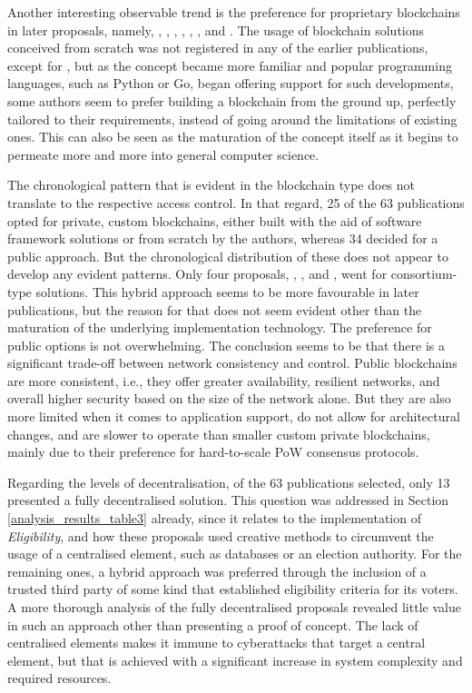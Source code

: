 \documentclass[../access.tex]{subfiles}
\begin{document}
\par
Another interesting observable trend is the preference for proprietary blockchains in later proposals, namely, \cite{Matile2019}, \cite{Faour2019}, \cite{Murtaza2019}, \cite{Yi2019}, \cite{Killer2020}, \cite{Han2020}, and \cite{Mani2022}. The usage of blockchain solutions conceived from scratch was not registered in any of the earlier publications, except for \cite{BenAyed2017}, but as the concept became more familiar and popular programming languages, such as Python or Go, began offering support for such developments, some authors seem to prefer building a blockchain from the ground up, perfectly tailored to their requirements, instead of going around the limitations of existing ones. This can also be seen as the maturation of the concept itself as it begins to permeate more and more into general computer science.
\par
The chronological pattern that is evident in the blockchain type does not translate to the respective access control. In that regard, 25 of the 63 publications opted for private, custom blockchains, either built with the aid of software framework solutions or from scratch by the authors, whereas 34 decided for a public approach. But the chronological distribution of these does not appear to develop any evident patterns. Only four proposals, \cite{Killer2020}, \cite{Han2020}, \cite{Hassan2022} and \cite{Mani2022}, went for consortium-type solutions. This hybrid approach seems to be more favourable in later publications, but the reason for that does not seem evident other than the maturation of the underlying implementation technology. The preference for public options is not overwhelming. The conclusion seems to be that there is a significant trade-off between network consistency and control. Public blockchains are more consistent, i.e., they offer greater availability, resilient networks, and overall higher security based on the size of the network alone. But they are also more limited when it comes to application support, do not allow for architectural changes, and are slower to operate than smaller custom private blockchains, mainly due to their preference for hard-to-scale PoW consensus protocols.
\par
Regarding the levels of decentralisation, of the 63 publications selected, only 13 presented a fully decentralised solution. This question was addressed in Section \ref{analysis_results_table3} already, since it relates to the implementation of \textit{Eligibility}, and how these proposals used creative methods to circumvent the usage of a centralised element, such as databases or an election authority. For the remaining ones, a hybrid approach was preferred through the inclusion of a trusted third party of some kind that established eligibility criteria for its voters. A more thorough analysis of the fully decentralised proposals revealed little value in such an approach other than presenting a proof of concept. The lack of centralised elements makes it immune to cyberattacks that target a central element, but that is achieved with a significant increase in system complexity and required resources.
\end{document}
